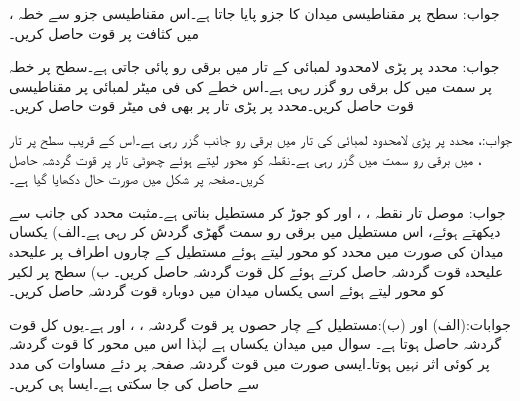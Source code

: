 جواب:
سطح  پر مقناطیسی میدان کا  جزو  پایا جاتا ہے۔اس مقناطیسی جزو سے خطہ ،  میں کثافت  پر قوت حاصل کریں۔

جواب:
 محدد پر پڑی لامحدود لمبائی کے تار میں  برقی رو پائی جاتی ہے۔سطح  پر خطہ  پر  سمت میں کل  برقی رو گزر رہی ہے۔اس خطے کی فی میٹر لمبائی پر مقناطیسی قوت حاصل کریں۔محدد  پر پڑی تار پر بھی فی میٹر قوت حاصل کریں۔

جواب:، 
محدد  پر پڑی لامحدود لمبائی کی تار میں  برقی رو  جانب گزر رہی ہے۔اس کے قریب سطح  پر تار ،  میں  برقی رو  سمت میں گزر رہی ہے۔نقطہ  کو محور لیتے ہوئے چھوٹی تار پر قوت گردشہ حاصل کریں۔صفحہ  پر شکل  میں صورت حال دکھایا گیا ہے۔

جواب:
موصل تار نقطہ ، ،  اور  کو جوڑ کر مستطیل بناتی ہے۔مثبت  محدد کی جانب سے دیکھتے ہوئے، اس مستطیل میں  برقی رو سمت گھڑی گردش کر رہی ہے۔الف)  یکساں میدان  کی صورت میں  محدد  کو محور لیتے ہوئے مستطیل کے چاروں اطراف پر علیحدہ علیحدہ  قوت گردشہ حاصل کرتے ہوئے کل قوت گردشہ حاصل کریں۔ ب) سطح  پر لکیر  کو محور لیتے ہوئے اسی یکساں میدان میں دوبارہ قوت گردشہ حاصل کریں۔

جوابات:(الف) اور (ب):مستطیل کے چار حصوں پر قوت گردشہ ، ،  اور  ہے۔یوں کل قوت گردشہ  حاصل ہوتا ہے۔
سوال  میں میدان یکساں ہے لہٰذا اس میں محور کا قوت گردشہ پر کوئی اثر نہیں ہوتا۔ایسی صورت میں قوت گردشہ صفحہ  پر دئے  مساوات  کی مدد سے حاصل کی جا سکتی ہے۔ایسا ہی کریں۔

